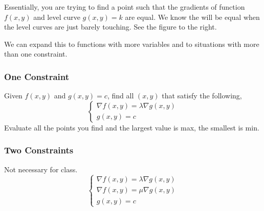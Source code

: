 \documentclass{article}
\begin{document}
Essentially, you are trying to find a point such that the gradients of function $f(x,y)$ and level curve $g(x,y)=k$ are equal. We know the will be equal when the level curves are just barely touching. See the figure to the right. 

We can expand this to functions with more variables and to situations with more than one constraint.

\subsubsection{One Constraint}
Given $f(x,y)$ and $g(x,y) = c$, find all $(x,y)$ that satisfy the following,
$$\left\{ \begin{array}{lr}
\nabla f(x,y) = \lambda \nabla g(x,y) \\
g(x,y) = c
\end{array} \right.$$
Evaluate all the points you find and the largest value is max, the smallest is min. 

\subsubsection{Two Constraints}
Not necessary for class. 
$$\left\{ \begin{array}{lr}
\nabla f(x,y) = \lambda \nabla g(x,y) \\
\nabla f(x,y) = \mu \nabla g(x,y) \\
g(x,y) = c
\end{array} \right.$$
\end{document}
